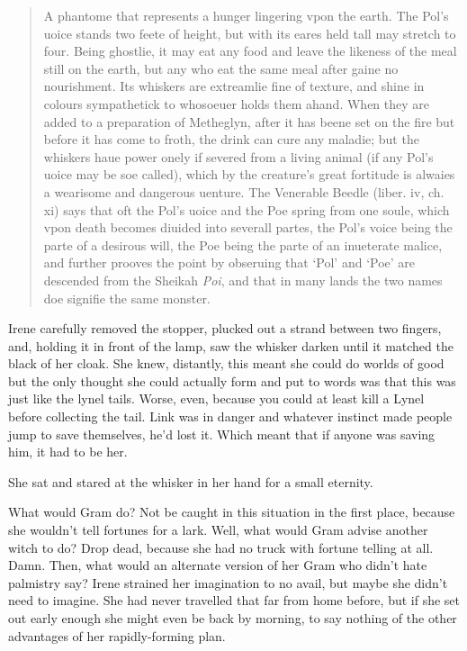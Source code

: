 \documentclass[../FGP.tex]{subfiles}
\begin{document}
\begin{quote}A phantome that represents a hunger lingering vpon the earth. The Pol's uoice stands two feete of height, but with its eares held tall may stretch to four. Being ghostlie, it may eat any food and leave the likeness of the meal still on the earth, but any who eat the same meal after gaine no nourishment. Its whiskers are extreamlie fine of texture, and shine in colours sympathetick to whosoeuer holds them ahand. When they are added to a preparation of Metheglyn, after it has beene set on the fire but before it has come to froth, the drink can cure any maladie; but the whiskers haue power onely if severed from a living animal (if any Pol's uoice may be soe called), which by the creature's great fortitude is alwaies a wearisome and dangerous uenture. The Venerable Beedle (liber. iv, ch. xi) says that oft the Pol's uoice and the Poe spring from one soule, which vpon death becomes diuided into severall partes, the Pol's voice being the parte of a desirous will, the Poe being the parte of an inueterate malice, and further prooves the point by obseruing that `Pol' and `Poe' are descended from the Sheikah \emph{Poi}, and that in many lands the two names doe signifie the same monster.\end{quote}
Irene carefully removed the stopper, plucked out a strand between two fingers, and, holding it in front of the lamp, saw the whisker darken until it matched the black of her cloak. She knew, distantly, this meant she could do worlds of good but the only thought she could actually form and put to words was that this was just like the lynel tails. Worse, even, because you could at least kill a Lynel before collecting the tail. Link was in danger and whatever instinct made people jump to save themselves, he'd lost it. Which meant that if anyone was saving him, it had to be her.

She sat and stared at the whisker in her hand for a small eternity.

What would Gram do? Not be caught in this situation in the first place, because she wouldn't tell fortunes for a lark. Well, what would Gram advise another witch to do? Drop dead, because she had no truck with fortune telling at all. Damn. Then, what would an alternate version of her Gram who didn't hate palmistry say? Irene strained her imagination to no avail, but maybe she didn't need to imagine. She had never travelled that far from home before, but if she set out early enough she might even be back by morning, to say nothing of the other advantages of her rapidly-forming plan. 
\end{document}

